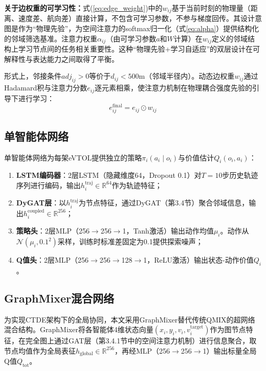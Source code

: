 \documentclass[12pt,a4paper,UTF8]{ctexart}
\begin{document}
\textbf{关于边权重的可学习性：}式(\ref{eq:edge_weight})中的$w_{ij}$基于当前时刻的物理量（距离、速度差、航向差）直接计算，不包含可学习参数，不参与梯度回传。其设计意图是作为``物理先验''，为空间注意力的softmax归一化（式\ref{eq:alpha}）提供结构化的邻域筛选基准。注意力权重$\alpha_{ij}$（由可学习参数$a$和$W$计算）在$w_{ij}$定义的邻域结构上学习节点间的任务相关重要性。这种``物理先验+学习自适应''的双层设计在可解释性与表达能力之间取得了平衡。

形式上，邻接条件$adj_{ij} > 0$等价于$d_{ij} < 500\text{m}$（邻域半径内）。动态边权重$w_{ij}$通过Hadamard积与注意力分数$e_{ij}$逐元素相乘，使注意力机制在物理耦合强度先验的引导下进行学习：
\begin{equation}
    e_{ij}^{\text{final}} = e_{ij} \odot w_{ij}
    \label{eq:edge_final}
\end{equation}

\subsection{单智能体网络}

单智能体网络为每架eVTOL提供独立的策略$\pi_i(a_i \mid o_i)$与价值估计$Q_i(o_i, a_i)$：

\begin{enumerate}[label=(\arabic*)]
    \item \textbf{LSTM编码器}：2层LSTM（隐藏维度64，Dropout 0.1）对$T=10$步历史轨迹序列进行编码，输出$h_i^{\text{traj}} \in \mathbb{R}^{64}$作为轨迹特征；
    \item \textbf{DyGAT层}：以$h_i^{\text{traj}}$为节点特征，通过DyGAT（第3.4节）聚合邻域信息，输出$h_i^{\text{coupled}} \in \mathbb{R}^{256}$；
    \item \textbf{策略头}：2层MLP（256$\to$256$\to$1，Tanh激活）输出动作均值$\mu_i$。动作从$\mathcal{N}(\mu_i, 0.1^2)$采样，训练时标准差固定为0.1提供探索噪声；
    \item \textbf{Q值头}：2层MLP（256$\to$256$\to$128$\to$1，ReLU激活）输出状态-动作价值$Q_i$。
\end{enumerate}

\subsection{GraphMixer混合网络}

为实现CTDE架构下的全局协同，本文采用GraphMixer替代传统QMIX的超网络混合结构\cite{ref11}。GraphMixer将各智能体4维状态向量$(x_i, y_i, v_i, v_i^{\text{target}})$作为图节点特征，在完全图上通过GAT层（第3.4.1节中的空间注意力机制）进行信息聚合，取节点均值作为全局表征$h_{\text{global}} \in \mathbb{R}^{256}$，再经MLP（256$\to$256$\to$1）输出标量全局Q值$Q_{\text{tot}}$。
\end{document}
